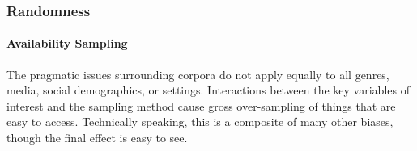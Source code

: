 \subsubsection{Randomness}







\paragraph{Availability Sampling}
The pragmatic issues surrounding corpora do not apply equally to all genres, media, social demographics, or settings.  Interactions between the key variables of interest and the sampling method cause gross over-sampling of things that are easy to access.  Technically speaking, this is a composite of many other biases, though the final effect is easy to see.

